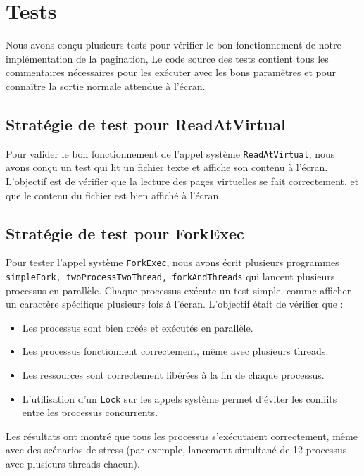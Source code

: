 \documentclass[a4paper,11pt]{article}
\begin{document}
\section{Tests}
Nous avons conçu plusieurs tests pour vérifier le bon fonctionnement de notre implémentation de la pagination, Le code source des tests contient tous les commentaires
nécessaires pour les exécuter avec les bons paramètres et pour connaître la sortie normale attendue à l'écran.

\subsection{Stratégie de test pour ReadAtVirtual}
Pour valider le bon fonctionnement de l'appel système \texttt{ReadAtVirtual}, nous avons conçu un test qui lit un fichier texte et affiche son contenu à l'écran. L'objectif est de vérifier que la lecture des pages virtuelles se fait correctement, et que le contenu du fichier est bien affiché à l'écran.

\subsection{Stratégie de test pour ForkExec}

Pour tester l'appel système \texttt{ForkExec}, nous avons écrit plusieurs programmes \texttt{simpleFork, twoProcessTwoThread, forkAndThreads} qui lancent plusieurs processus en parallèle. Chaque processus exécute un test simple, comme afficher un caractère spécifique plusieurs fois à l'écran. L'objectif était de vérifier que :
\begin{itemize}
    \item Les processus sont bien créés et exécutés en parallèle.
    \item Les processus fonctionnent correctement, même avec plusieurs threads.
    \item Les ressources sont correctement libérées à la fin de chaque processus.
    \item L'utilisation d'un \texttt{Lock} sur les appels système permet d'éviter les conflits entre les processus concurrents.
\end{itemize}
Les résultats ont montré que tous les processus s'exécutaient correctement, même avec des scénarios de stress (par exemple, lancement simultané de 12 processus avec plusieurs threads chacun).
\end{document}
